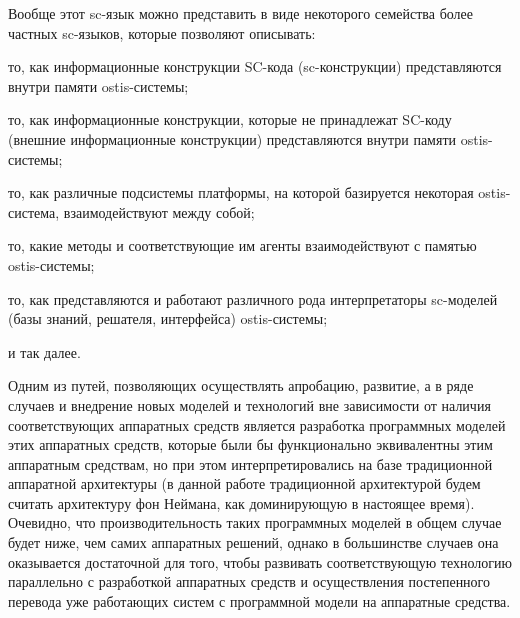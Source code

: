 Вообще этот sc-язык можно представить в виде некоторого семейства более частных sc-языков, которые позволяют описывать:
\begin{textitemize}
    \item то, как информационные конструкции SC-кода (sc-конструкции) представляются внутри памяти ostis-системы;
    \item то, как информационные конструкции, которые не принадлежат SC-коду (внешние информационные конструкции) представляются внутри памяти ostis-системы;
    \item то, как различные подсистемы платформы, на которой базируется некоторая ostis-система, взаимодействуют между собой;
    \item то, какие методы и соответствующие им агенты взаимодействуют с памятью ostis-системы;
    \item то, как представляются и работают различного рода интерпретаторы sc-моделей (базы знаний, решателя, интерфейса) ostis-системы;
    \item и так далее.
\end{textitemize}

Одним из путей, позволяющих осуществлять апробацию, развитие, а в ряде случаев и внедрение новых моделей и технологий вне зависимости от наличия соответствующих аппаратных средств является разработка программных моделей этих аппаратных средств, которые были бы функционально эквивалентны этим аппаратным средствам, но при этом интерпретировались на базе традиционной аппаратной архитектуры (в данной работе традиционной архитектурой будем считать архитектуру фон Неймана, как доминирующую в настоящее время). Очевидно, что производительность таких программных моделей в общем случае будет ниже, чем самих аппаратных решений, однако в большинстве случаев она оказывается достаточной для того, чтобы развивать
соответствующую технологию параллельно с разработкой аппаратных средств и осуществления постепенного перевода уже работающих систем с программной модели на аппаратные средства.

